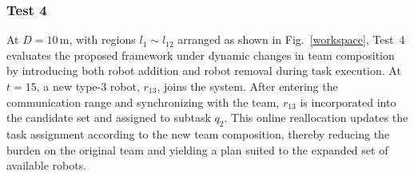 \documentclass[lettersize,journal]{IEEEtran}
\begin{document}
\subsubsection{Test 4}

At $D=10$\,m, with regions $l_1 \sim l_{12}$ arranged as shown in Fig.~\ref{workspace}, Test~4 evaluates the proposed framework under dynamic changes in team composition by introducing both robot addition and robot removal during task execution. At $t=15$, a new type-3 robot, $r_{13}$, joins the system. After entering the communication range and synchronizing with the team, $r_{13}$ is incorporated into the candidate set and assigned to subtask $q_2$. This online reallocation updates the task assignment according to the new team composition, thereby reducing the burden on the original team and yielding a plan suited to the expanded set of available robots.
\end{document}
